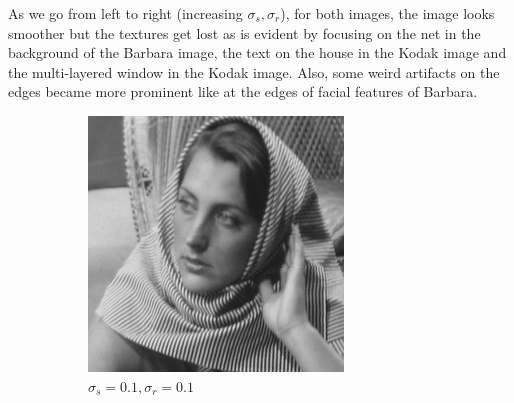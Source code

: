 \documentclass[a4paper, landscape]{article}
\begin{document}
As we go from left to right (increasing $\sigma_s, \sigma_r$), for both images, the image looks smoother but the textures get lost as is evident by focusing on the net in the background of the Barbara image, the text on the house in the Kodak image and the multi-layered window in the Kodak image. Also, some weird artifacts on the edges became more prominent like at the edges of facial features of Barbara.
\begin{figure}
    \centering
    \begin{subfigure}{0.33\linewidth}
        \centering
        \includegraphics[width=\linewidth]{barbara256,σ_spatial0.1,σ_range0.1.png}
        \caption{$\sigma_s=0.1, \sigma_r=0.1$}
    \end{subfigure}
    \begin{subfigure}{0.33\linewidth}
        \centering

\end{subfigure}
\end{figure}
\end{document}
